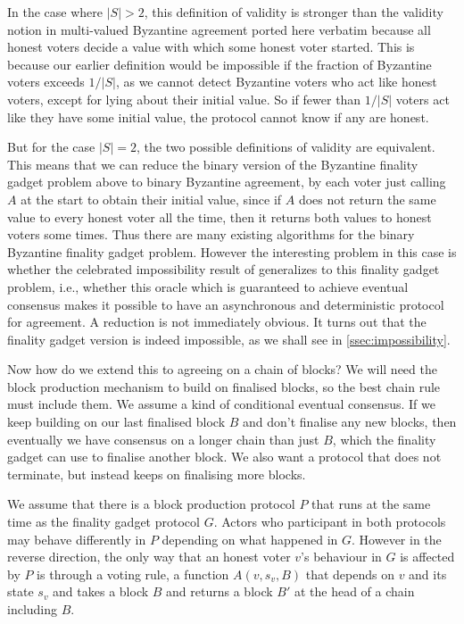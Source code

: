 \documentclass{article}
\begin{document}
In the case where $|S| > 2$, this definition of validity is stronger than the validity notion in multi-valued Byzantine agreement ported here verbatim because all honest voters decide a value with which some honest voter started. 
This is because our earlier definition would be impossible if the fraction of Byzantine voters exceeds $1/|S|$, as we cannot detect Byzantine voters who act like honest voters, except for lying about their initial value.
So if fewer than $1/|S|$ voters act like they have some initial value, the protocol cannot know if any are honest. 


But for the case $|S|=2$, the two possible definitions of validity are equivalent.
This means that we can reduce the binary version of the Byzantine finality gadget problem above to binary Byzantine agreement, by each voter just calling $A$ at the start to obtain their initial value, since if $A$ does not return the same value to every honest voter all the time, then it returns both values to honest voters some times.
Thus there are many existing algorithms for the binary Byzantine finality gadget problem.
However the interesting problem in this case is whether the celebrated impossibility result of \cite{flp} generalizes to this finality gadget problem, i.e., whether this oracle which is guaranteed to achieve eventual consensus makes it possible to have an asynchronous and deterministic protocol for agreement.
A reduction is not immediately obvious. It turns out that the finality gadget version is indeed impossible, as we shall see in \ref{ssec:impossibility}.

Now how do we extend this to agreeing on a chain of blocks? We will need the block production mechanism to build on finalised blocks, so the best chain rule must include them.
We assume a kind of conditional eventual consensus.
If we keep building on our last finalised block $B$ and don't finalise any new blocks, then eventually we have consensus on a longer chain than just $B$, which the finality gadget can use to finalise another block.
We also want a protocol that does not terminate, but instead keeps on finalising more blocks. 

We assume that there is a block production protocol $P$ that runs at the same time as the finality gadget protocol $G$. Actors who participant in both protocols may behave differently in $P$ depending on what happened in $G$.
However in the reverse direction, the only way that an honest voter $v$'s behaviour in $G$ is affected by $P$ is through a voting rule, a function $A(v,s_v,B)$ that depends on $v$ and its state $s_v$ and takes a block $B$ and returns a block $B'$ at the head of a chain including $B$.
\end{document}

